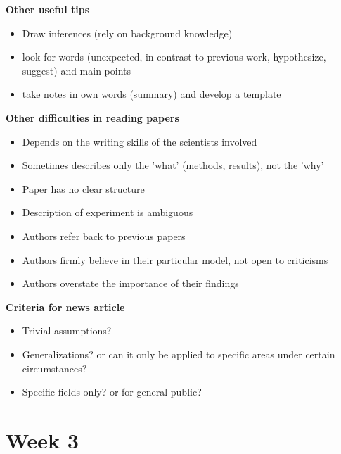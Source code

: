 \documentclass{article}
\begin{document}
\begin{multicols}{2}
\textbf{Other useful tips}
\begin{itemize}
	\item Draw inferences (rely on background knowledge)
	\item look for words (unexpected, in contrast to previous work, hypothesize, suggest) and main points
	\item take notes in own words (summary) and develop a template
\end{itemize}
\textbf{Other difficulties in reading papers}
\begin{itemize}
	\item Depends on the writing skills of the scientists involved
	\item Sometimes describes only the 'what' (methods, results), not the 'why'
	\item Paper has no clear structure
	\item Description of experiment is ambiguous
	\item Authors refer back to previous papers
	\item Authors firmly believe in their particular model, not open to criticisms
	\item Authors overstate the importance of their findings
\end{itemize}

\textbf{Criteria for news article}
\begin{itemize}
	\item Trivial assumptions?
	\item Generalizations? or can it only be applied to specific areas under certain circumstances?
	\item Specific fields only? or for general public?

\end{itemize}


\section{Week 3}

\end{multicols}
\end{document}
